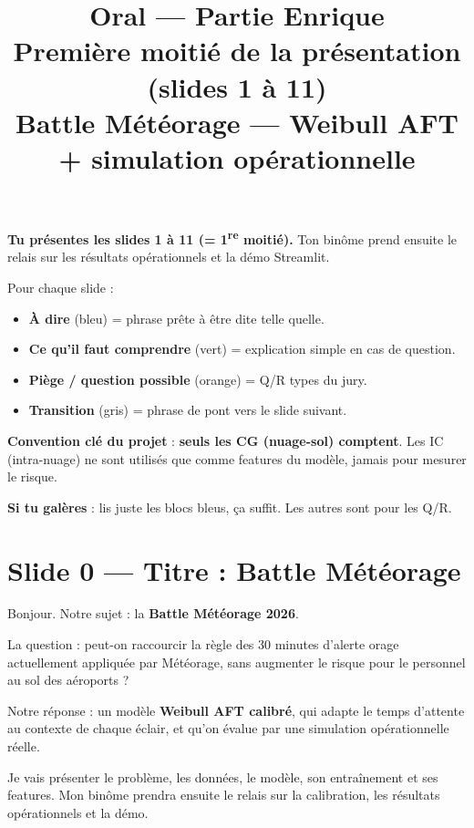 \documentclass[11pt,a4paper]{article}
\title{\textbf{Oral — Partie Enrique} \\[0.3em]
       \large Première moitié de la présentation (slides 1 à 11) \\
       \small Battle Météorage --- Weibull AFT + simulation opérationnelle}
\author{}
\date{}
\begin{document}
\maketitle

\begin{tcolorbox}[colback=yellow!8, colframe=yellow!50!black, title=\textbf{Mode d'emploi}]
\textbf{Tu présentes les slides 1 à 11 (= 1\textsuperscript{re} moitié).} Ton binôme prend ensuite
le relais sur les résultats opérationnels et la démo Streamlit.

Pour chaque slide :
\begin{itemize}[topsep=2pt]
    \item \textbf{À dire} (bleu) = phrase prête à être dite telle quelle.
    \item \textbf{Ce qu'il faut comprendre} (vert) = explication simple en cas de question.
    \item \textbf{Piège / question possible} (orange) = Q/R types du jury.
    \item \textbf{Transition} (gris) = phrase de pont vers le slide suivant.
\end{itemize}

\textbf{Convention clé du projet} : \textbf{seuls les CG (nuage-sol) comptent}. Les IC
(intra-nuage) ne sont utilisés que comme features du modèle, jamais pour mesurer le risque.

\textbf{Si tu galères} : lis juste les blocs bleus, ça suffit. Les autres sont pour les Q/R.
\end{tcolorbox}

\tableofcontents
\newpage

\section{Slide 0 — Titre : Battle Météorage}

\begin{dire}
\og Bonjour. Notre sujet : la \textbf{Battle Météorage 2026}.

La question : peut-on raccourcir la règle des 30 minutes d'alerte orage actuellement appliquée
par Météorage, sans augmenter le risque pour le personnel au sol des aéroports ?

Notre réponse : un modèle \textbf{Weibull AFT calibré}, qui adapte le temps d'attente au
contexte de chaque éclair, et qu'on évalue par une simulation opérationnelle réelle.

Je vais présenter le problème, les données, le modèle, son entraînement et ses features.
Mon binôme prendra ensuite le relais sur la calibration, les résultats opérationnels et la
démo. \fg{}
\end{dire}
\end{document}
